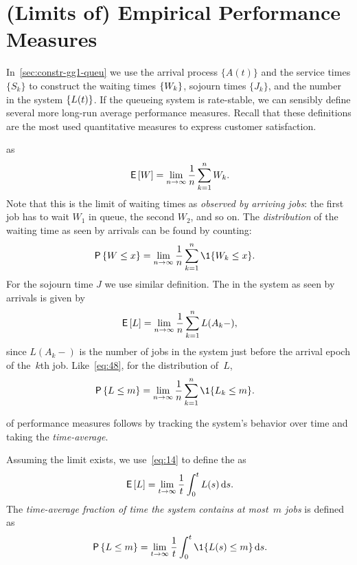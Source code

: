 \documentclass[queueing-book.tex]{subfiles}
\begin{document}
\section{(Limits of) Empirical Performance Measures}
\label{sec:limits-of-empirical}

In~\cref{sec:constr-gg1-queu} we use the arrival process $\{A(t)\}$ and the service times $\{S_k\}$ to construct the waiting times $\{W_k\}$, sojourn times $\{J_k\}$, and the number in the system $\{L(t)\}$.
If the queueing system is rate-stable, we can sensibly define several more long-run average performance measures.
Recall that these definitions are the most used quantitative measures to express customer satisfaction.




  as
\begin{equation*}
 \,\mathsf{E}\left[W\right] = \lim_{n\to\infty} \frac 1 n\sum_{k=1}^n W_{k}.
\end{equation*}
Note that this is the limit of waiting times as \emph{observed by arriving jobs}:
 the first job has to wait $W_1$ in queue, the second $W_2$, and so on.
The \emph{distribution} of the waiting time as seen by arrivals can be found by counting:
\begin{align}\label{eq:48}
 \P{\W \leq x} &= \lim_{n\to\infty} \frac 1n\sum_{k=1}^n \1{\W_k\leq x}.
\end{align}
For the sojourn time  $J$  we use similar definition.
The  in the system as seen by arrivals is given by
\begin{equation}\label{eq:EQ}
\,\mathsf{E}\left[L\right] = \lim_{n\to\infty}\frac 1 n \sum_{k=1}^n L(A_k-),
\end{equation}
since $L(A_k-)$ is the number of jobs in the system just before the arrival epoch of the~$k$th job.
Like~\cref{eq:48}, for the distribution of~$L$,
\begin{align}
 \P{\L \leq m} &= \lim_{n\to\infty} \frac 1n\sum_{k=1}^n \1{\L_k\leq m}.
\end{align}



 of performance measures follows by tracking the system's behavior over time and taking the \emph{time-average}.

Assuming the limit exists, we use~\cref{eq:14} to define the  as
\begin{equation} \label{eq:46}
 \,\mathsf{E}\left[L\right] = \lim_{t\to\infty} \frac 1 t\int_0^t L(s) \,\textrm{d}s.
\end{equation}
 The \emph{time-average fraction of time the system contains at most~$m$ jobs} is defined as
\begin{equation*}
 \P{\L\leq m} =\lim_{t\to\infty} \frac 1 t\int_0^t \1{\L(s)\leq m} \d s.
\end{equation*}
\end{document}
